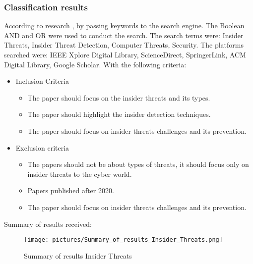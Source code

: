 \documentclass{ijitcs}
\begin{document}
\subsubsection{Classification results}

According to research \cite{singh2022systematic}, by passing keywords to the search engine. The Boolean AND and OR were used to conduct the search. The search terms were: Insider Threats, Insider Threat Detection, Computer Threats, Security. The platforms searched were: IEEE Xplore Digital Library, ScienceDirect, SpringerLink, ACM Digital Library, Google Scholar. With the following criteria:


\begin{itemize}
    \item  Inclusion Criteria
    
\begin{itemize}
    \item   The paper should focus on the insider threats and its types.
    \item    The paper should highlight the insider detection techniques.
    \item     The paper should focus on insider threats challenges and its prevention.
\end{itemize}

    \item Exclusion criteria

    
\begin{itemize}
    \item   The papers should not be about types of threats, it should focus only on insider threats to the cyber world.
    \item    Papers published after 2020.
    \item     The paper should focus on insider threats challenges and its prevention.
\end{itemize}
\end{itemize}



Summary of results received\cite{singh2022systematic}:


\begin{figure}[H]
\centering
\texttt{[image: pictures/Summary\_of\_results\_Insider\_Threats.png]}
    \caption{Summary of results Insider Threats} 
    \label{fig:Summary_of_results_Insider_Threats}
\end{figure}
\end{document}
